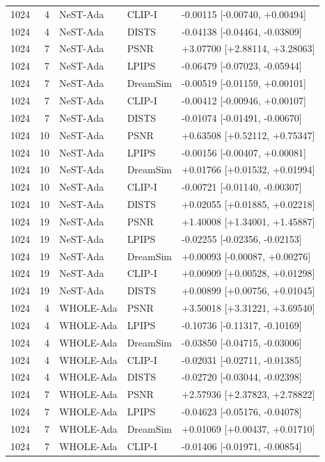 \documentclass[10pt,letterpaper]{article}
\begin{document}
\begin{longtable}{@{}rrlll@{}}
1024 & 4 & NeST-Ada & CLIP-I & -0.00115 [-0.00740, +0.00494]\\
1024 & 4 & NeST-Ada & DISTS & -0.04138 [-0.04464, -0.03809]\\
1024 & 7 & NeST-Ada & PSNR & +3.07700 [+2.88114, +3.28063]\\
1024 & 7 & NeST-Ada & LPIPS & -0.06479 [-0.07023, -0.05944]\\
1024 & 7 & NeST-Ada & DreamSim & -0.00519 [-0.01159, +0.00101]\\
1024 & 7 & NeST-Ada & CLIP-I & -0.00412 [-0.00946, +0.00107]\\
1024 & 7 & NeST-Ada & DISTS & -0.01074 [-0.01491, -0.00670]\\
1024 & 10 & NeST-Ada & PSNR & +0.63508 [+0.52112, +0.75347]\\
1024 & 10 & NeST-Ada & LPIPS & -0.00156 [-0.00407, +0.00081]\\
1024 & 10 & NeST-Ada & DreamSim & +0.01766 [+0.01532, +0.01994]\\
1024 & 10 & NeST-Ada & CLIP-I & -0.00721 [-0.01140, -0.00307]\\
1024 & 10 & NeST-Ada & DISTS & +0.02055 [+0.01885, +0.02218]\\
1024 & 19 & NeST-Ada & PSNR & +1.40008 [+1.34001, +1.45887]\\
1024 & 19 & NeST-Ada & LPIPS & -0.02255 [-0.02356, -0.02153]\\
1024 & 19 & NeST-Ada & DreamSim & +0.00093 [-0.00087, +0.00276]\\
1024 & 19 & NeST-Ada & CLIP-I & +0.00909 [+0.00528, +0.01298]\\
1024 & 19 & NeST-Ada & DISTS & +0.00899 [+0.00756, +0.01045]\\
1024 & 4 & WHOLE-Ada & PSNR & +3.50018 [+3.31221, +3.69540]\\
1024 & 4 & WHOLE-Ada & LPIPS & -0.10736 [-0.11317, -0.10169]\\
1024 & 4 & WHOLE-Ada & DreamSim & -0.03850 [-0.04715, -0.03006]\\
1024 & 4 & WHOLE-Ada & CLIP-I & -0.02031 [-0.02711, -0.01385]\\
1024 & 4 & WHOLE-Ada & DISTS & -0.02720 [-0.03044, -0.02398]\\
1024 & 7 & WHOLE-Ada & PSNR & +2.57936 [+2.37823, +2.78822]\\
1024 & 7 & WHOLE-Ada & LPIPS & -0.04623 [-0.05176, -0.04078]\\
1024 & 7 & WHOLE-Ada & DreamSim & +0.01069 [+0.00437, +0.01710]\\
1024 & 7 & WHOLE-Ada & CLIP-I & -0.01406 [-0.01971, -0.00854]\\

\end{longtable}
\end{document}
